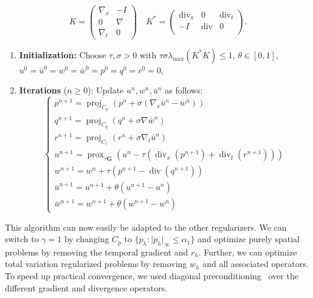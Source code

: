 \documentclass{article}
\DeclareMathOperator{\Div}{div}
\DeclareMathOperator*{\prox}{prox}
\newcommand{\proj}{\operatorname{proj}}
\begin{document}
	\begin{equation*}
		K= \begin{pmatrix}
			\nabla_x&-I\\
			0&\nabla\\
			\nabla_t& 0
		\end{pmatrix}\quad K^*= \begin{pmatrix}
			\Div_x& 0 &\Div_t\\
			-I&\Div&0\\
		\end{pmatrix}.
	\end{equation*}
	\begin{algorithm}%
		\caption{First-Order Primal-Dual Algorithm for $ \mathbf{TGV_{P1}^2}$}\label{alg:algorithm}
		\begin{enumerate}
			\item \textbf{Initialization:} Choose $\tau, \sigma > 0$ with $\tau\sigma\lambda_\mathrm{max}(K^*K)\leq 1$, $\theta \in [0, 1]$, $u^0= \bar{u}^0=w^0=\bar{w}^0=p^0=q^0=r^0=0$,
			\item \textbf{Iterations} ($n \geq 0$): Update $u^n, w^n, \bar{u}^n$ as follows:
			\[
			\begin{cases}
				p^{n+1} = \proj_{C_p}(p^n + \sigma (\nabla_x\bar{u}^n - w^n)) \\
				q^{n+1} = \proj_{C_q}(q^n + \sigma \nabla \bar{w}^n) \\
				r^{n+1} = \proj_{C_r}(r^n + \sigma \nabla_t\bar{u}^n) \\
				u^{n+1} = \prox_{\tau \mathbf{G}}(u^n - \tau (\Div_x(p^{n+1}) +\Div_t(r^{n+1}))) \\
				w^{n+1} = w^n + \tau(p^{n+1}- \Div(q^{n+1}))\\
				\bar{u}^{n+1} = u^{n+1} + \theta(u^{n+1} - u^n)\\
				\bar{w}^{n+1} = w^{n+1} + \theta(w^{n+1} - w^n)
			\end{cases}
			\]
		\end{enumerate}
	\end{algorithm}
	
	This algorithm can now easily be adapted to the other regularizers.
	We can switch to $\gamma=1$ by changing $C_p$ to $\lbrace p_h: \vert p_h\vert_\infty\leq \alpha_1\rbrace$ and optimize purely spatial problems by removing the temporal gradient and $r_h$.
	Further, we can optimize total variation regularized problems by removing $w_h$ and all associated operators.
	To speed up practical convergence, we used diagonal preconditioning~\cite{Po11} over the different gradient and divergence operators.
\end{document}
